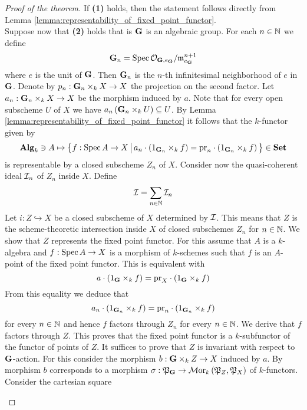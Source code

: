 \begin{proof}[Proof of the theorem]
If \textbf{(1)} holds, then the statement follows directly from Lemma \ref{lemma:representability_of_fixed_point_functor}.\\
Suppose now that \textbf{(2)} holds that is $\mathbf{G}$ is an algebraic group. For each $n\in {\mathbb N}$ we define
$$\mathbf{G}_n = \mathrm{Spec}\, {\mathcal O}_{\mathbf{G},e_{\mathbf{G}}}/\mathfrak{m}_{e_{\mathbf{G}}}^{n+1}$$
where $e$ is the unit of $\mathbf{G}$. Then $\mathbf{G}_n$ is the $n$-th infinitesimal neighborhood of $e$ in $\mathbf{G}$. Denote by $p_n:\mathbf{G}_n\times_kX\rightarrow X$ the projection on the second factor. Let $a_n:\mathbf{G}_n\times_kX\rightarrow X$ be the morphism induced by $a$. Note that for every open subscheme $U$ of $X$ we have $a_n\left(\mathbf{G}_n\times_kU\right)\subseteq U$. By Lemma \ref{lemma:representability_of_fixed_point_functor} it follows that the $k$-functor given by
$$\mathbf{Alg}_k \ni A \mapsto \big\{f:\mathrm{Spec}\, A\rightarrow X\,\big|\,a_n\cdot \left(1_{\mathbf{G}_n}\times_k f\right) = \mathrm{pr}_n\cdot \left(1_{\mathbf{G}_n}\times_kf\right)\big\} \in \mathbf{Set}$$
is representable by a closed subscheme $Z_n$ of $X$. Consider now the quasi-coherent ideal ${\mathcal I}_n$ of $Z_n$ inside $X$. Define
$${\mathcal I} = \sum_{n\in {\mathbb N}}{\mathcal I}_n$$
Let $i:Z\hookrightarrow X$ be a closed subscheme of $X$ determined by ${\mathcal I}$. This means that $Z$ is the scheme-theoretic intersection inside $X$ of closed subschemes $Z_n$ for $n\in {\mathbb N}$. We show that $Z$ represents the fixed point functor. For this assume that $A$ is a $k$-algebra and $f:\mathrm{Spec}\, A\rightarrow X$ is a morphism of $k$-schemes such that $f$ is an $A$-point of the fixed point functor. This is equivalent with
$$a\cdot \left(1_{\mathbf{G}}\times_k f\right) = \mathrm{pr}_X\cdot \left(1_{\mathbf{G}}\times_kf\right)$$
From this equality we deduce that
$$a_n\cdot \left(1_{\mathbf{G}_n}\times_k f\right) = \mathrm{pr}_n\cdot \left(1_{\mathbf{G}_n}\times_kf\right)$$
for every $n\in {\mathbb N}$ and hence $f$ factors through $Z_n$ for every $n\in {\mathbb N}$. We derive that $f$ factors through $Z$. This proves that the fixed point functor is a $k$-subfunctor of the functor of points of $Z$. It suffices to prove that $Z$ is invariant with respect to $\mathbf{G}$-action. For this consider the morphism $b:\mathbf{G}\times_kZ\rightarrow X$ induced by $a$. By {\cite[Corollary 4.6]{Monoid_k_functors}} morphism $b$ corresponds to a morphism $\sigma:{\mathfrak P}_{\mathbf{G}} \rightarrow \mathcal{M}\mathrm{or}_k\left({\mathfrak P}_{Z},{\mathfrak P}_X\right)$ of $k$-functors. Consider the cartesian square
\begin{center}
\end{center}
\end{proof}
